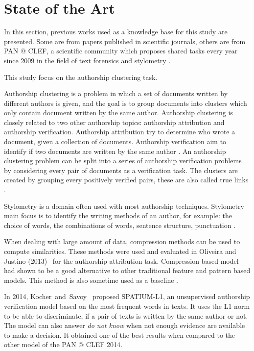 \chapter{State of the Art \label{sec:state_of_the_art}}

In this section, previous works used as a knowledge base for this study are presented.
Some are from papers published in scientific journals, others are from PAN @ CLEF, a scientific community which proposes shared tasks every year since 2009 in the field of text forensics and stylometry \cite{pan_webis}.

This study focus on the authorship clustering task.

Authorship clustering is a problem in which a set of documents written by different authors is given, and the goal is to group documents into clusters which only contain document written by the same author.
Authorship clustering is closely related to two other authorship topics: authorship attribution and authorship verification.
Authorship attribution try to determine who wrote a document, given a collection of documents.
Authorship verification aim to identify if two documents are written by the same author \cite{pan11_verif}.
An authorship clustering problem can be split into a series of authorship verification problems by considering every pair of documents as a verification task.
The clusters are created by grouping every positively verified pairs, these are also called true links \cite{pan16_clustering_site}.

Stylometry is a domain often used with most authorship techniques.
Stylometry main focus is to identify the writing methods of an author, for example: the choice of words, the combinations of words, sentence structure, punctuation \cite{savoy_stylo}.

When dealing with large amount of data, compression methods can be used to compute similarities.
These methods were used and evaluated in Oliveira and Justino (2013)~\cite{comparing_compression} for the authorship attribution task.
Compression based model had shown to be a good alternative to other traditional feature and pattern based models.
This method is also sometime used as a baseline \cite{overview_pan20}.

In 2014, Kocher~and~Savoy~\cite{kocher_linking} proposed SPATIUM-L1, an unsupervised authorship verification model based on the most frequent words in texts.
It uses the L1 norm to be able to discriminate, if a pair of texts is written by the same author or not.
The model can also answer \textit{do not know} when not enough evidence are available to make a decision.
It obtained one of the best results when compared to the other model of the PAN @ CLEF 2014.


